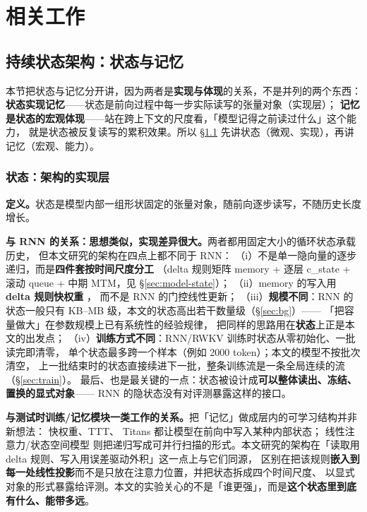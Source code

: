 \section{相关工作}\label{sec:related}

\subsection{持续状态架构：状态与记忆}\label{sec:related-state}

本节把状态与记忆分开讲，因为两者是\textbf{实现与体现}的关系，不是并列的两个东西：
\textbf{状态实现记忆}——状态是前向过程中每一步实际读写的张量对象（实现层）；
\textbf{记忆是状态的宏观体现}——站在跨上下文的尺度看，「模型记得之前读过什么」这个能力，
就是状态被反复读写的累积效果。所以 \S\ref{sec:related-state} 先讲状态（微观、实现），再讲记忆（宏观、能力）。

\subsubsection{状态：架构的实现层}\label{sec:related-state-impl}

\textbf{定义。}状态是模型内部一组形状固定的张量对象，随前向逐步读写，不随历史长度增长。

\textbf{与 RNN 的关系：思想类似，实现差异很大。}两者都用固定大小的循环状态承载历史，
但本文研究的架构在四点上都不同于 RNN：
（i）不是单一隐向量的逐步递归，而是\textbf{四件套按时间尺度分工}
（delta 规则矩阵 memory + 逐层 c\_state + 滚动 queue + 中期 MTM，见 \S\ref{sec:model-state}）；
（ii）memory 的写入用 \textbf{delta 规则快权重}
\citep{schmidhuber1992learning,schlag2021linear,sun2023retnet,yang2024deltanet}，
而不是 RNN 的门控线性更新；
（iii）\textbf{规模不同}：RNN 的状态一般只有 KB--MB 级，本文的状态高出若干数量级（\S\ref{sec:bg}）——
「把容量做大」在参数规模上已有系统性的经验规律\citep{kaplan2020scaling}，
把同样的思路用在\textbf{状态}上正是本文的出发点；
（iv）\textbf{训练方式不同}：RNN/RWKV 训练时状态从零初始化、一批读完即清零，
单个状态最多跨一个样本（例如 2000 token）；本文的模型不按批次清空，
上一批结束时的状态直接续进下一批，整条训练流是一条全局连续的流（\S\ref{sec:train}）。
最后、也是最关键的一点：状态被设计成\textbf{可以整体读出、冻结、置换的显式对象}——
RNN 的隐状态没有对评测暴露这样的接口。

\textbf{与测试时训练/记忆模块一类工作的关系。}把「记忆」做成层内的可学习结构并非新想法：
快权重\citep{schmidhuber1992learning,ba2016using}、TTT\citep{sun2024ttt}、
Titans\citep{behrouz2025titans} 都让模型在前向中写入某种内部状态；
线性注意力/状态空间模型\citep{katharopoulos2020transformers,gu2023mamba,peng2023rwkv}
则把递归写成可并行扫描的形式。本文研究的架构在「读取用 delta 规则、写入用误差驱动外积」这一点上与它们同源，
区别在把该规则\textbf{嵌入到每一处线性投影}而不是只放在注意力位置，并把状态拆成四个时间尺度、
以显式对象的形式暴露给评测。本文的实验关心的不是「谁更强」，而是\textbf{这个状态里到底有什么、能带多远}。

